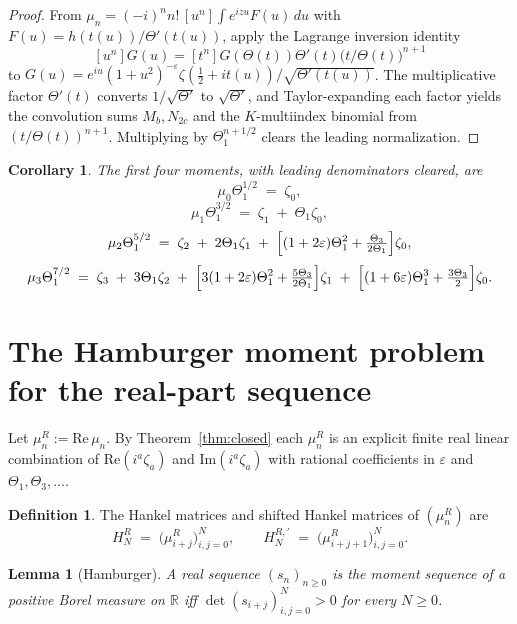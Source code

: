 \documentclass[11pt]{amsart}
\newtheorem{lemma}[theorem]{Lemma}
\newtheorem{corollary}[theorem]{Corollary}
\theoremstyle{definition}
\newtheorem{definition}[theorem]{Definition}
\begin{document}
\begin{proof}
From $\mu_{n}=(-i)^{n}n!\,[u^{n}]\!\int e^{izu}F(u)\,du$ with $F(u)=h(t(u))/\Theta'(t(u))$,
apply the Lagrange inversion identity
\[
[u^{n}]G(u)=[t^{n}]G(\Theta(t))\Theta'(t)\bigl(t/\Theta(t)\bigr)^{n+1}
\]
to $G(u)=e^{iu}(1+u^{2})^{-\varepsilon}\zeta(\tfrac12+it(u))/\sqrt{\Theta'(t(u))}$.
The multiplicative factor $\Theta'(t)$ converts $1/\sqrt{\Theta'}$ to
$\sqrt{\Theta'}$, and Taylor-expanding each factor yields the convolution
sums $M_{b},N_{2c}$ and the $K$-multiindex binomial from
$(t/\Theta(t))^{n+1}$. Multiplying by $\Theta_{1}^{n+1/2}$ clears the leading
normalization.
\end{proof}

\begin{corollary}\label{cor:first4}
The first four moments, with leading denominators cleared, are
\[
\mu_{0}\Theta_{1}^{1/2}\;=\;\zeta_{0},
\]
\[
\mu_{1}\Theta_{1}^{3/2}\;=\;\zeta_{1}\;+\;\Theta_{1}\zeta_{0},
\]
\[
\mu_{2}\Theta_{1}^{5/2}\;=\;\zeta_{2}\;+\;2\Theta_{1}\zeta_{1}\;+\;\Bigl[(1+2\varepsilon)\Theta_{1}^{2}+\tfrac{\Theta_{3}}{2\Theta_{1}}\Bigr]\zeta_{0},
\]
\[
\mu_{3}\Theta_{1}^{7/2}\;=\;\zeta_{3}\;+\;3\Theta_{1}\zeta_{2}\;+\;\Bigl[3(1+2\varepsilon)\Theta_{1}^{2}+\tfrac{5\Theta_{3}}{2\Theta_{1}}\Bigr]\zeta_{1}\;+\;\Bigl[(1+6\varepsilon)\Theta_{1}^{3}+\tfrac{3\Theta_{3}}{2}\Bigr]\zeta_{0}.
\]
\end{corollary}

\section{The Hamburger moment problem for the real-part sequence}

Let $\mu_{n}^{R}:=\mathrm{Re}\,\mu_{n}$. By Theorem~\ref{thm:closed} each
$\mu_{n}^{R}$ is an explicit finite real linear combination of
$\mathrm{Re}(i^{a}\zeta_{a})$ and $\mathrm{Im}(i^{a}\zeta_{a})$ with
rational coefficients in $\varepsilon$ and $\Theta_{1},\Theta_{3},\ldots$.

\begin{definition}\label{def:hankel}
The Hankel matrices and shifted Hankel matrices of $(\mu_{n}^{R})$ are
\[
H_{N}^{R}\;=\;\bigl(\mu_{i+j}^{R}\bigr)_{i,j=0}^{N},\qquad
H_{N}^{R,\prime}\;=\;\bigl(\mu_{i+j+1}^{R}\bigr)_{i,j=0}^{N}.
\]
\end{definition}

\begin{lemma}[Hamburger]\label{lem:hamburger}
A real sequence $(s_{n})_{n\ge 0}$ is the moment sequence of a positive
Borel measure on $\mathbb{R}$ iff $\det(s_{i+j})_{i,j=0}^{N}>0$ for every
$N\ge 0$.
\end{lemma}
\end{document}
